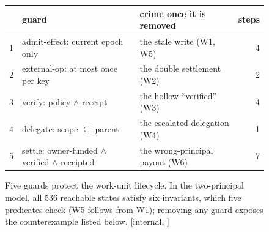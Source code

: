 \begin{figure}[H]
\medskip
{\pdcaptionface\footnotesize
\begin{tabularx}{\linewidth}{@{}c >{\raggedright\arraybackslash}X >{\raggedright\arraybackslash}X r@{}}
\toprule
 & guard & crime once it is removed & steps \\
\midrule
1 & admit-effect: current epoch only & the stale write (W1, W5) & 4 \\
2 & external-op: at most once per key & the double settlement (W2) & 2 \\
3 & verify: policy $\wedge$ receipt & the hollow ``verified'' (W3) & 4 \\
4 & delegate: scope $\subseteq$ parent & the escalated delegation (W4) & 1 \\
5 & settle: owner-funded $\wedge$ verified $\wedge$ receipted & the wrong-principal payout (W6) & 7 \\
\bottomrule
\end{tabularx}}
\caption{Five guards protect the work-unit lifecycle. In the two-principal
model, all 536 reachable states satisfy six invariants, which five
predicates check (W5 follows from W1); removing any guard
exposes the counterexample listed below. [internal,
\protect{}]}
\label{fig:swk-workunit-machine}
\end{figure}
